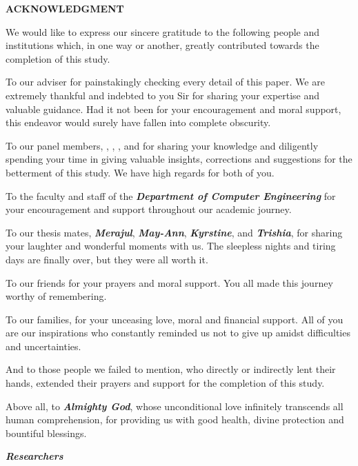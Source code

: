 \begin{center}
{\bf ACKNOWLEDGMENT}\\[24pt]
\end{center}
{\baselineskip

We would like to express our sincere gratitude to the following people and institutions which, in one way or another, greatly contributed towards the completion of this study. 

To our adviser \textbf{\textit{\adviser}} for painstakingly checking every detail of this paper. We are extremely thankful and indebted to you Sir for sharing your expertise and valuable guidance. Had it not been for your encouragement and moral support, this endeavor would surely have fallen into complete obscurity.

To our panel members, \textbf{\textit{\deptchair}}, \textbf{\textit{\panelone}}, \textbf{\textit{\paneltwo}}, and \textbf{\textit{\panelthree}} for sharing your knowledge and diligently spending your time in giving valuable insights, corrections and suggestions for the betterment of this study. We have high regards for both of you.

To the faculty and staff of the \textbf{\textit{Department of Computer Engineering}} for your encouragement and support throughout our academic journey.

To our thesis mates, \textbf{\textit{Merajul}}, \textbf{\textit{May-Ann}}, \textbf{\textit{Kyrstine}}, and \textbf{\textit{Trishia}}, for sharing your laughter and wonderful moments with us. The sleepless nights and tiring days are finally over, but they were all worth it.

To our friends for your prayers and moral support. You all made this journey worthy of remembering.

To our families, for your unceasing love, moral and financial support. All of you are our inspirations who constantly reminded us not to give up amidst difficulties and uncertainties.

And to those people we failed to mention, who directly or indirectly lent their hands, extended their prayers and support for the completion of this study. 

Above all, to \textbf{\textit{Almighty God}}, whose unconditional love infinitely transcends all human comprehension, for providing us with good health, divine protection and bountiful blessings.

\begin{flushright}
\textbf{\textit{Researchers}}
\end{flushright}



}